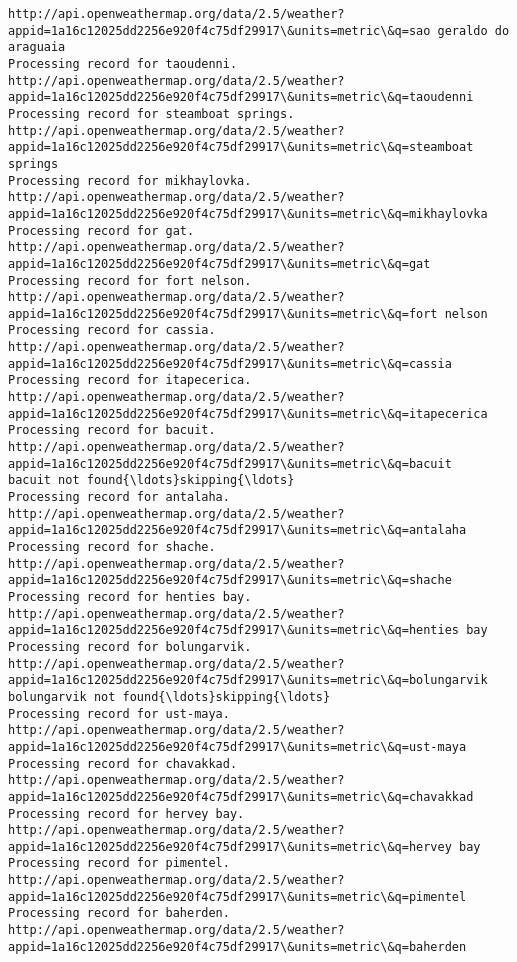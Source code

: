 \documentclass[11pt]{article}
\begin{document}
\begin{Verbatim}[commandchars=\\\{\}]
http://api.openweathermap.org/data/2.5/weather?appid=1a16c12025dd2256e920f4c75df29917\&units=metric\&q=sao geraldo do araguaia
Processing record for taoudenni.
http://api.openweathermap.org/data/2.5/weather?appid=1a16c12025dd2256e920f4c75df29917\&units=metric\&q=taoudenni
Processing record for steamboat springs.
http://api.openweathermap.org/data/2.5/weather?appid=1a16c12025dd2256e920f4c75df29917\&units=metric\&q=steamboat springs
Processing record for mikhaylovka.
http://api.openweathermap.org/data/2.5/weather?appid=1a16c12025dd2256e920f4c75df29917\&units=metric\&q=mikhaylovka
Processing record for gat.
http://api.openweathermap.org/data/2.5/weather?appid=1a16c12025dd2256e920f4c75df29917\&units=metric\&q=gat
Processing record for fort nelson.
http://api.openweathermap.org/data/2.5/weather?appid=1a16c12025dd2256e920f4c75df29917\&units=metric\&q=fort nelson
Processing record for cassia.
http://api.openweathermap.org/data/2.5/weather?appid=1a16c12025dd2256e920f4c75df29917\&units=metric\&q=cassia
Processing record for itapecerica.
http://api.openweathermap.org/data/2.5/weather?appid=1a16c12025dd2256e920f4c75df29917\&units=metric\&q=itapecerica
Processing record for bacuit.
http://api.openweathermap.org/data/2.5/weather?appid=1a16c12025dd2256e920f4c75df29917\&units=metric\&q=bacuit
bacuit not found{\ldots}skipping{\ldots}
Processing record for antalaha.
http://api.openweathermap.org/data/2.5/weather?appid=1a16c12025dd2256e920f4c75df29917\&units=metric\&q=antalaha
Processing record for shache.
http://api.openweathermap.org/data/2.5/weather?appid=1a16c12025dd2256e920f4c75df29917\&units=metric\&q=shache
Processing record for henties bay.
http://api.openweathermap.org/data/2.5/weather?appid=1a16c12025dd2256e920f4c75df29917\&units=metric\&q=henties bay
Processing record for bolungarvik.
http://api.openweathermap.org/data/2.5/weather?appid=1a16c12025dd2256e920f4c75df29917\&units=metric\&q=bolungarvik
bolungarvik not found{\ldots}skipping{\ldots}
Processing record for ust-maya.
http://api.openweathermap.org/data/2.5/weather?appid=1a16c12025dd2256e920f4c75df29917\&units=metric\&q=ust-maya
Processing record for chavakkad.
http://api.openweathermap.org/data/2.5/weather?appid=1a16c12025dd2256e920f4c75df29917\&units=metric\&q=chavakkad
Processing record for hervey bay.
http://api.openweathermap.org/data/2.5/weather?appid=1a16c12025dd2256e920f4c75df29917\&units=metric\&q=hervey bay
Processing record for pimentel.
http://api.openweathermap.org/data/2.5/weather?appid=1a16c12025dd2256e920f4c75df29917\&units=metric\&q=pimentel
Processing record for baherden.
http://api.openweathermap.org/data/2.5/weather?appid=1a16c12025dd2256e920f4c75df29917\&units=metric\&q=baherden

\end{Verbatim}
\end{document}
